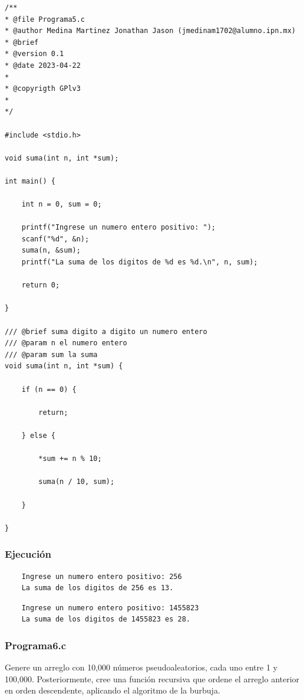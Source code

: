 \documentclass{article}
\begin{document}
	\begin{lstlisting}
/**
* @file Programa5.c
* @author Medina Martinez Jonathan Jason (jmedinam1702@alumno.ipn.mx)
* @brief 
* @version 0.1
* @date 2023-04-22
* 
* @copyrigth GPlv3
* 
*/

#include <stdio.h>

void suma(int n, int *sum);

int main() {
	
	int n = 0, sum = 0;
	
	printf("Ingrese un numero entero positivo: ");
	scanf("%d", &n);
	suma(n, &sum);
	printf("La suma de los digitos de %d es %d.\n", n, sum);
	
	return 0;
	
}

/// @brief suma digito a digito un numero entero
/// @param n el numero entero
/// @param sum la suma
void suma(int n, int *sum) {
	
	if (n == 0) {
		
		return;
		
	} else {
		
		*sum += n % 10;
		
		suma(n / 10, sum);
		
	}
	
}

	\end{lstlisting}
	
	\subsubsection{Ejecución}
	
	\begin{lstlisting}
	Ingrese un numero entero positivo: 256
	La suma de los digitos de 256 es 13.
	\end{lstlisting}
	\begin{lstlisting}
	Ingrese un numero entero positivo: 1455823
	La suma de los digitos de 1455823 es 28.
	\end{lstlisting}
	
	\subsubsection{Programa6.c}
	
	Genere un arreglo con 10,000 números pseudoaleatorios, cada uno entre 1 y 100,000.
	Posteriormente, cree una función recursiva que ordene el arreglo anterior en orden descendente, aplicando el algoritmo de la burbuja.
	
\end{document}
